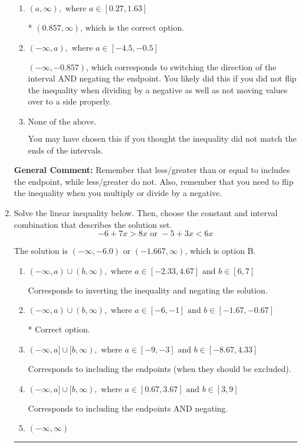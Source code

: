 \documentclass{extbook}[14pt]
\newcommand{\litem}[1]{\item #1

\rule{\textwidth}{0.4pt}}
\begin{document}
\begin{enumerate}
{\begin{enumerate}[label=\Alph*.]
 $(-\infty, 0.857)$, which corresponds to switching the direction of the interval. You likely did this if you did not flip the inequality when dividing by a negative!
\item \( (a, \infty), \text{ where } a \in [0.27, 1.63] \)

* $(0.857, \infty)$, which is the correct option.
\item \( (-\infty, a), \text{ where } a \in [-4.5, -0.5] \)

 $(-\infty, -0.857)$, which corresponds to switching the direction of the interval AND negating the endpoint. You likely did this if you did not flip the inequality when dividing by a negative as well as not moving values over to a side properly.
\item \( \text{None of the above}. \)

You may have chosen this if you thought the inequality did not match the ends of the intervals.
\end{enumerate}

\textbf{General Comment:} Remember that less/greater than or equal to includes the endpoint, while less/greater do not. Also, remember that you need to flip the inequality when you multiply or divide by a negative.
}
\litem{
Solve the linear inequality below. Then, choose the constant and interval combination that describes the solution set.
\[ -6 + 7 x > 8 x \text{ or } -5 + 3 x < 6 x \]

The solution is \( (-\infty, -6.0) \text{ or } (-1.667, \infty) \), which is option B.\begin{enumerate}[label=\Alph*.]
\item \( (-\infty, a) \cup (b, \infty), \text{ where } a \in [-2.33, 4.67] \text{ and } b \in [6, 7] \)

Corresponds to inverting the inequality and negating the solution.
\item \( (-\infty, a) \cup (b, \infty), \text{ where } a \in [-6, -1] \text{ and } b \in [-1.67, -0.67] \)

 * Correct option.
\item \( (-\infty, a] \cup [b, \infty), \text{ where } a \in [-9, -3] \text{ and } b \in [-8.67, 4.33] \)

Corresponds to including the endpoints (when they should be excluded).
\item \( (-\infty, a] \cup [b, \infty), \text{ where } a \in [0.67, 3.67] \text{ and } b \in [3, 9] \)

Corresponds to including the endpoints AND negating.
\item \( (-\infty, \infty) \)


\end{enumerate}}
\end{enumerate}
\end{document}
